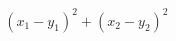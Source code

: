 \documentclass[preview]{standalone}
\begin{document}
\begin{align*}
(x_{1}-y_{1})^2 + (x_{2}-y_{2})^2 \\ &
\end{align*}
\end{document}
